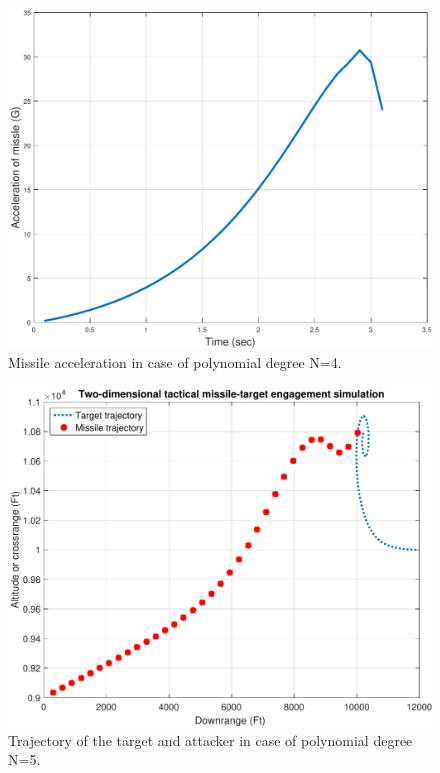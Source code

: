 \begin{figure}[htb]
	\centering
	\includegraphics[scale = 0.75]{fig/MissileAccelerationP4.pdf}
	\caption{Missile acceleration in case of polynomial degree N=4.}
	\label{missile accelerationP4}
\end{figure}


\begin{figure}[htb]
	\centering
	\includegraphics[scale = 0.75]{fig/trajectoryP5.pdf}
	\caption{Trajectory of the target and attacker in case of polynomial degree N=5.}
	\label{trajectoryP5}
\end{figure}


